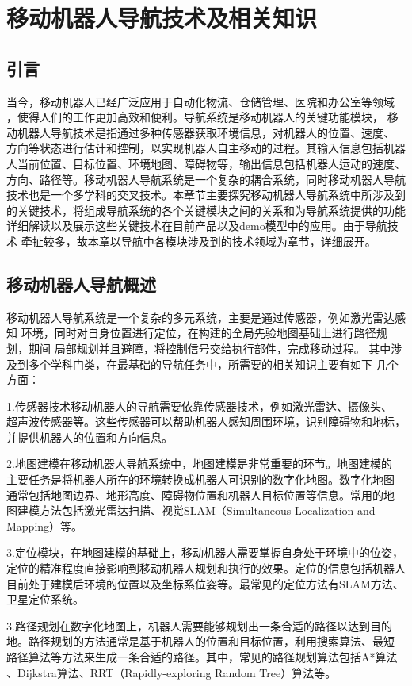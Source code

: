 \chapter{移动机器人导航技术及相关知识}

\section{引言}
当今，移动机器人已经广泛应用于自动化物流、仓储管理、医院和办公室等领域
，使得人们的工作更加高效和便利。导航系统是移动机器人的关键功能模块，
移动机器人导航技术是指通过多种传感器获取环境信息，对机器人的位置、速度、
方向等状态进行估计和控制，以实现机器人自主移动的过程。其输入信息包括机器
人当前位置、目标位置、环境地图、障碍物等，输出信息包括机器人运动的速度、
方向、路径等。移动机器人导航系统是一个复杂的耦合系统，同时移动机器人导航
技术也是一个多学科的交叉技术。本章节主要探究移动机器人导航系统中所涉及到
的关键技术，将组成导航系统的各个关键模块之间的关系和为导航系统提供的功能
详细解读以及展示这些关键技术在目前产品以及demo模型中的应用。由于导航技术
牵扯较多，故本章以导航中各模块涉及到的技术领域为章节，详细展开。

\section{移动机器人导航概述}
移动机器人导航系统是一个复杂的多元系统，主要是通过传感器，例如激光雷达感知
环境，同时对自身位置进行定位，在构建的全局先验地图基础上进行路径规划，期间
局部规划并且避障，将控制信号交给执行部件，完成移动过程。
其中涉及到多个学科门类，在最基础的导航任务中，所需要的相关知识主要有如下
几个方面：

1.传感器技术移动机器人的导航需要依靠传感器技术，例如激光雷达、摄像头、
超声波传感器等。这些传感器可以帮助机器人感知周围环境，识别障碍物和地标，
并提供机器人的位置和方向信息。

2.地图建模在移动机器人导航系统中，地图建模是非常重要的环节。地图建模的
主要任务是将机器人所在的环境转换成机器人可识别的数字化地图。数字化地图
通常包括地图边界、地形高度、障碍物位置和机器人目标位置等信息。常用的地
图建模方法包括激光雷达扫描、视觉SLAM（Simultaneous Localization and Mapping）等。

3.定位模块，在地图建模的基础上，移动机器人需要掌握自身处于环境中的位姿，
定位的精准程度直接影响到移动机器人规划和执行的效果。定位的信息包括机器人
目前处于建模后环境的位置以及坐标系位姿等。最常见的定位方法有SLAM方法、
卫星定位系统。

3.路径规划在数字化地图上，机器人需要能够规划出一条合适的路径以达到目的
地。路径规划的方法通常是基于机器人的位置和目标位置，利用搜索算法、最短
路径算法等方法来生成一条合适的路径。其中，常见的路径规划算法包括A*算法
、Dijkstra算法、RRT（Rapidly-exploring Random Tree）算法等。

